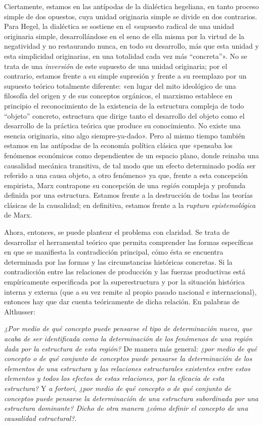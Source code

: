 Ciertamente, estamos en las antípodas de la dialéctica hegeliana, en tanto proceso simple de dos opuestos, cuya unidad originaria simple se divide en dos contrarios. Para Hegel, la dialéctica se sostiene en el «supuesto radical de una unidad originaria simple, desarrollándose en el seno de ella misma por la virtud de la negatividad y no restaurando nunca, en todo su desarrollo, más que esta unidad y esta simplicidad originarias, en una totalidad cada vez más ``concreta''». No se trata de una \emph{inversión} de este supuesto de una unidad originaria; por el contrario, estamos frente a su simple supresión y frente a su reemplazo por un supuesto teórico totalmente diferente: «en lugar del mito ideológico de una filosofía del origen y de sus conceptos orgánicos, el marxismo establece en principio el reconocimiento de la existencia de la estructura compleja de todo ``objeto'' concreto, estructura que dirige tanto el desarrollo del objeto como el desarrollo de la práctica teórica que produce su conocimiento. No existe una esencia originaria, sino algo siempre-ya-dado». Pero al mismo tiempo también estamos en las antípodas de la economía política clásica que «pensaba los fenómenos económicos como dependientes de un espacio plano, donde reinaba una causalidad mecánica transitiva, de tal modo que un efecto determinado podía ser referido a una causa objeto, a otro fenómeno» ya que, frente a esta concepción empirista, Marx contrapone su concepción de una \emph{región} compleja y profunda definida por una estructura. Estamos frente a la destrucción de todas las teorías clásicas de la causalidad; en definitiva, estamos frente a la \emph{ruptura epistemológica} de Marx.

Ahora, entonces, se puede plantear el problema con claridad. Se trata de desarrollar el herramental teórico que permita comprender las formas específicas en que se manifiesta la contradicción principal, cómo ésta se encuentra determinada por las formas y las circunstancias históricas concretas. Si la contradicción entre las relaciones de producción y las fuerzas productivas está empíricamente especificada por la superestructura y por la situación histórica interna y externa (que a su vez remite al propio pasado nacional e internacional), entonces hay que dar cuenta teóricamente de dicha relación. En palabras de Althusser:

\emph{¿Por medio de qué concepto puede pensarse el tipo de determinación nueva, que acaba de ser identificada como la determinación de los fenómenos de una región dada por la estructura de esta región?} De manera más general: \emph{¿por medio de qué concepto o de qué conjunto de conceptos puede pensarse la determinación de los elementos de una estructura y las relaciones estructurales existentes entre estos elementos y todos los efectos de estas relaciones, por la eficacia de esta estructura? }Y \emph{a fortori}, \emph{¿por medio de qué concepto o de qué conjunto de conceptos puede pensarse la determinación de una estructura subordinada por una estructura dominante? Dicho de otra manera ¿cómo definir el concepto de una causalidad estructural?}.

